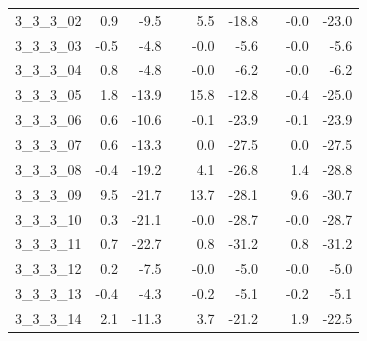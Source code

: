 \begin{longtable}{lrrcrrcrr}
3\_3\_3\_02      &                 0.9 &                  -9.5 &&                  5.5 &                  -18.8 &&                 -0.0 &                  -23.0 \\
3\_3\_3\_03      &                -0.5 &                  -4.8 &&                 -0.0 &                   -5.6 &&                 -0.0 &                   -5.6 \\
3\_3\_3\_04      &                 0.8 &                  -4.8 &&                 -0.0 &                   -6.2 &&                 -0.0 &                   -6.2 \\
3\_3\_3\_05      &                 1.8 &                 -13.9 &&                 15.8 &                  -12.8 &&                 -0.4 &                  -25.0 \\
3\_3\_3\_06      &                 0.6 &                 -10.6 &&                 -0.1 &                  -23.9 &&                 -0.1 &                  -23.9 \\
3\_3\_3\_07      &                 0.6 &                 -13.3 &&                  0.0 &                  -27.5 &&                  0.0 &                  -27.5 \\
3\_3\_3\_08      &                -0.4 &                 -19.2 &&                  4.1 &                  -26.8 &&                  1.4 &                  -28.8 \\
3\_3\_3\_09      &                 9.5 &                 -21.7 &&                 13.7 &                  -28.1 &&                  9.6 &                  -30.7 \\
3\_3\_3\_10      &                 0.3 &                 -21.1 &&                 -0.0 &                  -28.7 &&                 -0.0 &                  -28.7 \\
3\_3\_3\_11      &                 0.7 &                 -22.7 &&                  0.8 &                  -31.2 &&                  0.8 &                  -31.2 \\
3\_3\_3\_12      &                 0.2 &                  -7.5 &&                 -0.0 &                   -5.0 &&                 -0.0 &                   -5.0 \\
3\_3\_3\_13      &                -0.4 &                  -4.3 &&                 -0.2 &                   -5.1 &&                 -0.2 &                   -5.1 \\
3\_3\_3\_14      &                 2.1 &                 -11.3 &&                  3.7 &                  -21.2 &&                  1.9 &                  -22.5 \\

\end{longtable}
